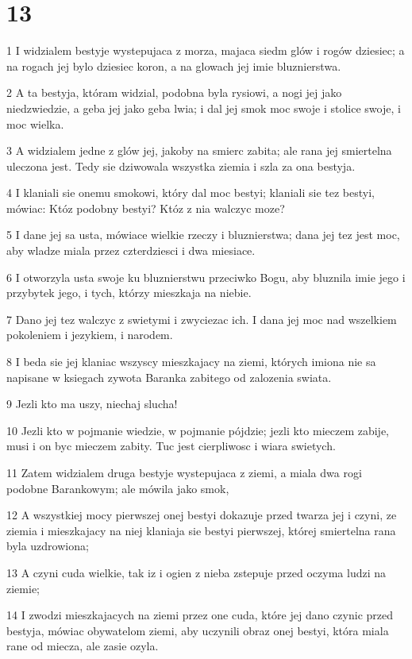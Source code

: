 \chapter{13}

\par 1 I widzialem bestyje wystepujaca z morza, majaca siedm glów i rogów dziesiec; a na rogach jej bylo dziesiec koron, a na glowach jej imie bluznierstwa.
\par 2 A ta bestyja, któram widzial, podobna byla rysiowi, a nogi jej jako niedzwiedzie, a geba jej jako geba lwia; i dal jej smok moc swoje i stolice swoje, i moc wielka.
\par 3 A widzialem jedne z glów jej, jakoby na smierc zabita; ale rana jej smiertelna uleczona jest. Tedy sie dziwowala wszystka ziemia i szla za ona bestyja.
\par 4 I klaniali sie onemu smokowi, który dal moc bestyi; klaniali sie tez bestyi, mówiac: Któz podobny bestyi? Któz z nia walczyc moze?
\par 5 I dane jej sa usta, mówiace wielkie rzeczy i bluznierstwa; dana jej tez jest moc, aby wladze miala przez czterdziesci i dwa miesiace.
\par 6 I otworzyla usta swoje ku bluznierstwu przeciwko Bogu, aby bluznila imie jego i przybytek jego, i tych, którzy mieszkaja na niebie.
\par 7 Dano jej tez walczyc z swietymi i zwyciezac ich. I dana jej moc nad wszelkiem pokoleniem i jezykiem, i narodem.
\par 8 I beda sie jej klaniac wszyscy mieszkajacy na ziemi, których imiona nie sa napisane w ksiegach zywota Baranka zabitego od zalozenia swiata.
\par 9 Jezli kto ma uszy, niechaj slucha!
\par 10 Jezli kto w pojmanie wiedzie, w pojmanie pójdzie; jezli kto mieczem zabije, musi i on byc mieczem zabity. Tuc jest cierpliwosc i wiara swietych.
\par 11 Zatem widzialem druga bestyje wystepujaca z ziemi, a miala dwa rogi podobne Barankowym; ale mówila jako smok,
\par 12 A wszystkiej mocy pierwszej onej bestyi dokazuje przed twarza jej i czyni, ze ziemia i mieszkajacy na niej klaniaja sie bestyi pierwszej, której smiertelna rana byla uzdrowiona;
\par 13 A czyni cuda wielkie, tak iz i ogien z nieba zstepuje przed oczyma ludzi na ziemie;
\par 14 I zwodzi mieszkajacych na ziemi przez one cuda, które jej dano czynic przed bestyja, mówiac obywatelom ziemi, aby uczynili obraz onej bestyi, która miala rane od miecza, ale zasie ozyla.
